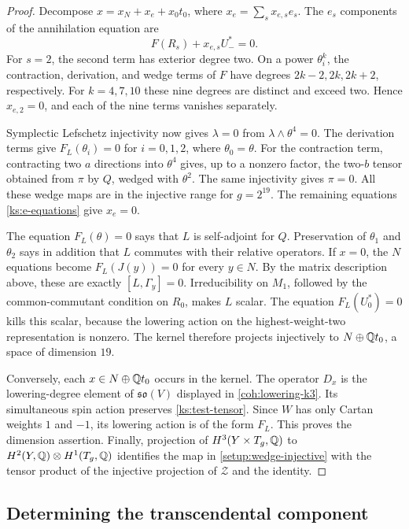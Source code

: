 \begin{proof}
Decompose
$x=x_N+x_e+x_0t_0$, where $x_e=\sum_sx_{e,s}e_s$.
The $e_s$ components of the annihilation equation are
\begin{equation}
 \label{ks:e-equations}
 F(R_s)+x_{e,s}U_-^*=0.
\end{equation}
For $s=2$, the second term has exterior degree two.  On a
power $\theta_i^k$, the contraction, derivation, and wedge
terms of $F$ have degrees $2k-2,2k,2k+2$, respectively.
For $k=4,7,10$ these nine degrees are distinct and exceed
two.  Hence $x_{e,2}=0$, and each of the nine terms vanishes
separately.

Symplectic Lefschetz injectivity now gives $\lambda=0$ from
$\lambda\wedge\theta^4=0$.  The derivation terms give
$F_L(\theta_i)=0$ for $i=0,1,2$, where $\theta_0=\theta$.
For the contraction term, contracting two $a$ directions into
$\theta^4$ gives, up to a nonzero factor, the two-$b$ tensor
obtained from $\pi$ by $Q$, wedged with $\theta^2$.
The same injectivity gives $\pi=0$.  All these wedge maps
are in the injective range for $g=2^{19}$.  The remaining
equations \eqref{ks:e-equations} give $x_e=0$.

The equation $F_L(\theta)=0$ says that $L$ is self-adjoint
for $Q$.  Preservation of $\theta_1$ and $\theta_2$ says
in addition that $L$ commutes with their relative operators.
If $x=0$, the $N$ equations become
$F_L(J(y))=0$ for every $y\in N$.  By the matrix description
above, these are exactly
$[L,\Gamma_y]=0$.  Irreducibility on $M_1$, followed by
the common-commutant condition on $R_0$, makes $L$ scalar.
The equation $F_L(U_0^*)=0$ kills this scalar, because
the lowering action on the highest-weight-two representation
is nonzero.  The kernel therefore projects injectively to
$N\oplus\mathbb Q t_0$, a space of dimension $19$.

Conversely, each $x\in N\oplus\mathbb Q t_0$ occurs in the kernel.
The operator $D_x$ is the lowering-degree element of
$\mathfrak{so}(V)$ displayed in \eqref{coh:lowering-k3}.
Its simultaneous spin action preserves \eqref{ks:test-tensor}.
Since $W$ has only Cartan weights $1$ and $-1$, its lowering
action is of the form $F_L$.  This proves the dimension
assertion.  Finally, projection of $H^3(Y\times T_g,\mathbb Q)$
to $H^2(Y,\mathbb Q)\otimes H^1(T_g,\mathbb Q)$ identifies the map in
\eqref{setup:wedge-injective} with the tensor product of
the injective projection of $\mathcal Z$ and the identity.
\end{proof}

\subsection{Determining the transcendental component}
\label{ks:exactness-section}

